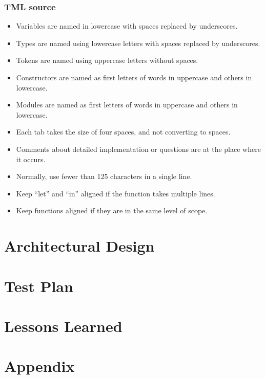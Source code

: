 \documentclass[12pt,psfig,a4]{article}
\begin{document}
\subsubsection{TML source}
\begin{itemize}
\item Variables are named in lowercase with spaces replaced by underscores.

\item Types are named using lowercase letters with spaces replaced by underscores.

\item Tokens are named using uppercase letters without spaces.

\item Constructors are named as first letters of words in uppercase and others in lowercase.

\item Modules are named as first letters of words in uppercase and others in lowercase.

\item Each tab takes the size of four spaces, and not converting to spaces.

\item Comments about detailed implementation or questions are at the place where it occurs.

\item Normally, use fewer than 125 characters in a single line.

\item Keep ``let'' and ``in'' aligned if the function takes multiple lines.

\item Keep functions aligned if they are in the same level of scope.
\end{itemize}



\pagebreak
\section{Architectural Design}


\pagebreak
\section{Test Plan}


\pagebreak
\section{Lessons Learned}


\pagebreak
\section{Appendix}



\end{document}

